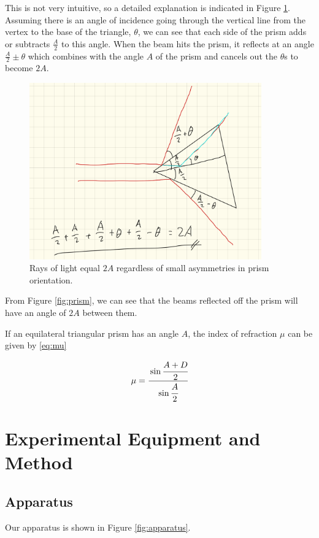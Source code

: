 \documentclass{article}
\begin{document}
This is not very intuitive, so a detailed explanation is indicated in Figure \ref{fig:proof}. Assuming there is an angle of incidence going through the vertical line from the vertex to the base of the triangle, $\theta$, we can see that each side of the prism adds or subtracts $\frac{A}{2}$ to this angle. When the beam hits the prism, it reflects at an angle $\frac{A}{2} \pm \theta$ which combines with the angle $A$ of the prism and cancels out the $\theta$s to become $2A$.

\begin{figure}[h]
  \includegraphics[width=100mm]{./img/proof.pdf}
  \caption{Rays of light equal $2A$ regardless of small asymmetries in prism orientation.}
  \label{fig:proof}
\end{figure}

From Figure \ref{fig:prism}, we can see that the beams reflected off the prism will have an angle of $2A$ between them.

If an equilateral triangular prism has an angle $A$, the index of refraction $\mu$ can be given by \eqref{eq:mu} \autocite{UPCSE2018}

\begin{equation}\label{eq:mu}
  \mu = \cfrac{
    \sin{\cfrac{A+D}{2}}
  }{
    \sin{\cfrac{A}{2}}
  }
\end{equation}

\section{Experimental Equipment and Method}
\subsection{Apparatus}

Our apparatus is shown in Figure \ref{fig:apparatus}.
\end{document}
